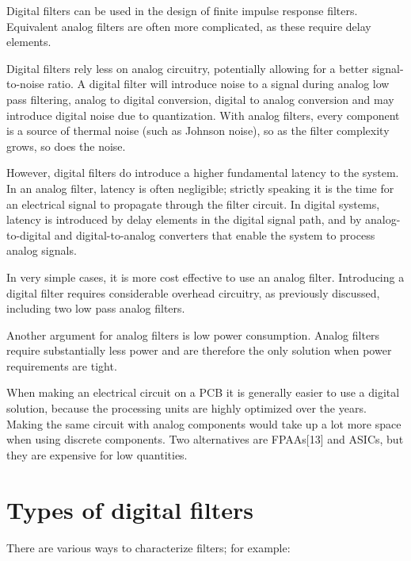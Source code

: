 \documentclass[12pt,a4paper,twocolumn]{scrartcl}
\begin{document}
Digital filters can be used in the design of finite impulse response filters. Equivalent analog filters are often more complicated, as these require delay elements.

Digital filters rely less on analog circuitry, potentially allowing for a better signal-to-noise ratio. A digital filter will introduce noise to a signal during analog low pass filtering, analog to digital conversion, digital to analog conversion and may introduce digital noise due to quantization. With analog filters, every component is a source of thermal noise (such as Johnson noise), so as the filter complexity grows, so does the noise.

However, digital filters do introduce a higher fundamental latency to the system. In an analog filter, latency is often negligible; strictly speaking it is the time for an electrical signal to propagate through the filter circuit. In digital systems, latency is introduced by delay elements in the digital signal path, and by analog-to-digital and digital-to-analog converters that enable the system to process analog signals.

In very simple cases, it is more cost effective to use an analog filter. Introducing a digital filter requires considerable overhead circuitry, as previously discussed, including two low pass analog filters.

Another argument for analog filters is low power consumption. Analog filters require substantially less power and are therefore the only solution when power requirements are tight.

When making an electrical circuit on a PCB it is generally easier to use a digital solution, because the processing units are highly optimized over the years. Making the same circuit with analog components would take up a lot more space when using discrete components. Two alternatives are FPAAs[13] and ASICs, but they are expensive for low quantities.
\section{\centering Types of digital filters}
There are various ways to characterize filters; for example:
\end{document}
